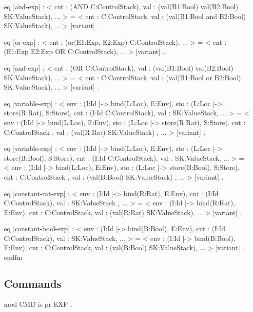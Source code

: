 \documentclass{llncs}%
\begin{document}
    eq [and-exp] :
        < cnt : (AND C:ControlStack),
          val : (val(B1:Bool) val(B2:Bool) SK:ValueStack), ... > 
     =
        < cnt : C:ControlStack,
          val : (val(B1:Bool and B2:Bool) SK:ValueStack), ... > [variant] .

    eq [or-exp] :
        < cnt : (or(E1:Exp, E2:Exp) C:ControlStack), ... > 
     =
        < cnt : (E1:Exp E2:Exp OR C:ControlStack), ... > [variant] .

    eq [and-exp] :
        < cnt : (OR C:ControlStack),
          val : (val(B1:Bool) val(B2:Bool) SK:ValueStack), ... > 
     =
        < cnt : C:ControlStack,
          val : (val(B1:Bool or B2:Bool) SK:ValueStack), ... > [variant] .

    eq [variable-exp] :
        < env : (I:Id |-> bind(L:Loc), E:Env),
          sto : (L:Loc |-> store(R:Rat), S:Store),
          cnt : (I:Id C:ControlStack), val : SK:ValueStack, ... > 
     =
        < env : (I:Id |-> bind(L:Loc), E:Env),
          sto : (L:Loc |-> store(R:Rat), S:Store),
          cnt : C:ControlStack ,
          val : (val(R:Rat) SK:ValueStack) , ... > [variant] .

    eq [variable-exp] :
        < env : (I:Id |-> bind(L:Loc), E:Env),
          sto : (L:Loc |-> store(B:Bool), S:Store),
          cnt : (I:Id C:ControlStack), val : SK:ValueStack, ... > 
     =
        < env : (I:Id |-> bind(L:Loc), E:Env),
          sto : (L:Loc |-> store(B:Bool), S:Store),
          cnt : C:ControlStack ,
          val : (val(B:Bool) SK:ValueStack) , ... > [variant] .

    eq [constant-rat-exp] :
        < env : (I:Id |-> bind(R:Rat), E:Env), cnt : (I:Id C:ControlStack),
          val : SK:ValueStack , ... > 
     =
        < env : (I:Id |-> bind(R:Rat), E:Env), cnt : C:ControlStack,
          val : (val(R:Rat) SK:ValueStack), ... > [variant] .

    eq [constant-bool-exp] :
        < env : (I:Id |-> bind(B:Bool), E:Env), cnt : (I:Id C:ControlStack),
          val : SK:ValueStack, ... > 
     =
        < env : (I:Id |-> bind(B:Bool), E:Env), cnt : C:ControlStack,
          val : (val(B:Bool) SK:ValueStack), ... > [variant] .        
endfm
\nwendcode{}\nwdocspar

\subsection{Commands}
\nwenddocs{}\endmoddef\nwstartdeflinemarkup\nwenddeflinemarkup
mod CMD is
    pr EXP .
\end{document}
